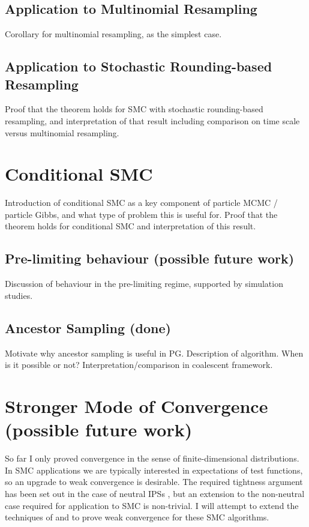 \documentclass{article}
\begin{document}
\subsection{Application to Multinomial Resampling}
Corollary for multinomial resampling, as the simplest case.
\subsection{Application to Stochastic Rounding-based Resampling}
Proof that the theorem holds for SMC with stochastic rounding-based resampling, and interpretation of that result including comparison on time scale versus multinomial resampling.

\section{Conditional SMC}
Introduction of conditional SMC as a key component of particle MCMC / particle Gibbs, and what type of problem this is useful for. Proof that the theorem holds for conditional SMC and interpretation of this result.
\subsection{Pre-limiting behaviour (possible future work)}
Discussion of behaviour in the pre-limiting regime, supported by simulation studies.
\subsection{Ancestor Sampling (done)}
Motivate why ancestor sampling is useful in PG. Description of algorithm. When is it possible or not? Interpretation/comparison in coalescent framework.

\section{Stronger Mode of Convergence (possible future work)}
So far I only proved convergence in the sense of finite-dimensional distributions. In SMC applications we are typically interested in expectations of test functions, so an upgrade to weak convergence is desirable. The required tightness argument has been set out in the case of neutral IPSs \citep{mohle1999}, but an extension to the non-neutral case required for application to SMC is non-trivial. I will attempt to extend the techniques of \citet{mohle1999} and \citet{gerber2017} to prove weak convergence for these SMC algorithms.
\end{document}
